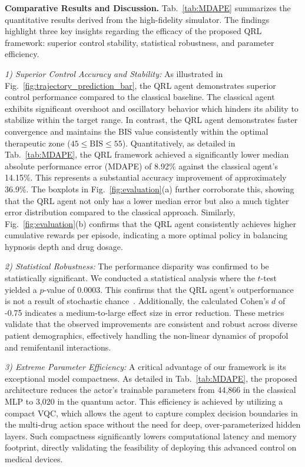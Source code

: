 \documentclass[pdflatex,sn-mathphys-num]{sn-jnl}%
\newcommand{\BfPara}[1]{{\noindent\bf#1.}\xspace}
\theoremstyle{thmstyleone}%
\theoremstyle{thmstyletwo}%
\theoremstyle{thmstylethree}%
\begin{document}
\BfPara{Comparative Results and Discussion}Tab.~\ref{tab:MDAPE} summarizes the quantitative results derived from the high-fidelity simulator. The findings highlight three key insights regarding the efficacy of the proposed QRL framework: superior control stability, statistical robustness, and parameter efficiency.

\noindent\textit{1) Superior Control Accuracy and Stability:} 
As illustrated in Fig.~\ref{fig:trajectory_prediction_bar}, the QRL agent demonstrates superior control performance compared to the classical baseline. The classical agent exhibits significant overshoot and oscillatory behavior which hinders its ability to stabilize within the target range. In contrast, the QRL agent demonstrates faster convergence and maintains the BIS value consistently within the optimal therapeutic zone ($45 \le \text{BIS} \le 55$). Quantitatively, as detailed in Tab.~\ref{tab:MDAPE}, the QRL framework achieved a significantly lower median absolute performance error (MDAPE) of 8.92\% against the classical agent's 14.15\%. This represents a substantial accuracy improvement of approximately 36.9\%. The boxplots in Fig.~\ref{fig:evaluation}(a) further corroborate this, showing that the QRL agent not only has a lower median error but also a much tighter error distribution compared to the classical approach. Similarly, Fig.~\ref{fig:evaluation}(b) confirms that the QRL agent consistently achieves higher cumulative rewards per episode, indicating a more optimal policy in balancing hypnosis depth and drug dosage.

\noindent\textit{2) Statistical Robustness:} The performance disparity was confirmed to be statistically significant. We conducted a statistical analysis where the $t$-test yielded a $p$-value of 0.0003. This confirms that the QRL agent's outperformance is not a result of stochastic chance~\citep{aga_21_dee}. Additionally, the calculated Cohen's $d$ of -0.75 indicates a medium-to-large effect size in error reduction. %
These metrics validate that the observed improvements are consistent and robust across diverse patient demographics, effectively handling the non-linear dynamics of propofol and remifentanil interactions.

\noindent\textit{3) Extreme Parameter Efficiency:} 
A critical advantage of our framework is its exceptional model compactness. As detailed in Tab.~\ref{tab:MDAPE}, the proposed architecture reduces the actor's trainable parameters from 44,866 in the classical MLP to 3,020 in the quantum actor. This efficiency is achieved by utilizing a compact VQC, which allows the agent to capture complex decision boundaries in the multi-drug action space without the need for deep, over-parameterized hidden layers. Such compactness significantly lowers computational latency and memory footprint, directly validating the feasibility of deploying this advanced control on medical devices.
\end{document}
